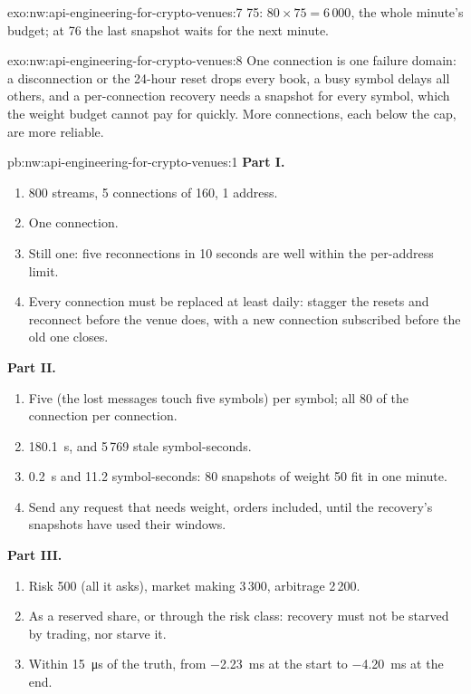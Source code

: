\begin{solution}{exo:nw:api-engineering-for-crypto-venues:7}
75: $80 \times 75 = 6\,000$, the whole minute's budget; at 76 the last snapshot waits for the next minute.
\end{solution}

\begin{solution}{exo:nw:api-engineering-for-crypto-venues:8}
One connection is one failure domain: a disconnection or the 24-hour reset drops every book, a busy symbol delays all others, and a per-connection
recovery needs a snapshot for every symbol, which the weight budget cannot pay for quickly. More connections, each below the cap, are more reliable.
\end{solution}

\begin{solution}{pb:nw:api-engineering-for-crypto-venues:1}
\textbf{Part I.}
\begin{enumerate}
\item 800 streams, 5 connections of 160, 1 address.
\item One connection.
\item Still one: five reconnections in 10 seconds are well within the per-address limit.
\item Every connection must be replaced at least daily: stagger the resets and reconnect before the venue does, with a new connection subscribed before
  the old one closes.
\end{enumerate}
\textbf{Part II.}
\begin{enumerate}[resume]
\item Five (the lost messages touch five symbols) per symbol; all 80 of the connection per connection.
\item \qty{180.1}{\second}, and 5\,769 stale symbol-seconds.
\item \qty{0.2}{\second} and 11.2 symbol-seconds: 80 snapshots of weight 50 fit in one minute.
\item Send any request that needs weight, orders included, until the recovery's snapshots have used their windows.
\end{enumerate}
\textbf{Part III.}
\begin{enumerate}[resume]
\item Risk 500 (all it asks), market making 3\,300, arbitrage 2\,200.
\item As a reserved share, or through the risk class: recovery must not be starved by trading, nor starve it.
\item Within \qty{15}{\micro\second} of the truth, from \qty{-2.23}{\milli\second} at the start to \qty{-4.20}{\milli\second} at the end.

\end{enumerate}
\end{solution}
